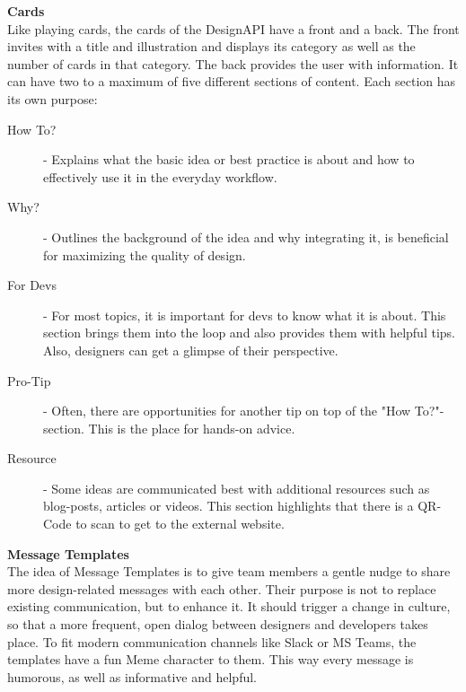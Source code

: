 \textbf{Cards}\\
Like playing cards, the cards of the DesignAPI have a front and a back. The front invites with a
title and illustration and displays its category as well as the number of cards in that category.
The back provides the user with information. It can have two to a maximum of five different sections
of content. Each section has its own purpose:

\begin{description}
    \item[How To?] - Explains what the basic idea or best practice is about and how to
          effectively use it in the everyday workflow.

    \item[Why?] - Outlines the background of the idea and why integrating it, is beneficial for
          maximizing the quality of design.

    \item[For Devs] - For most topics, it is important for devs to know what it is about. This
          section brings them into the loop and also provides them with helpful tips. Also,
          designers can get a glimpse of their perspective.

    \item[Pro-Tip] - Often, there are opportunities for another tip on top of the "How To?"-section.
          This is the place for hands-on advice.

    \item[Resource] - Some ideas are communicated best with additional resources such as blog-posts,
          articles or videos. This section highlights that there is a QR-Code to scan to get to the
          external website.
\end{description}

\textbf{Message Templates}\\
The idea of Message Templates is to give team members a gentle nudge to share more design-related
messages with each other. Their purpose is not to replace existing communication, but to enhance it.
It should trigger a change in culture, so that a more frequent, open dialog between designers and
developers takes place.
To fit modern communication channels like Slack or MS Teams, the templates have a fun Meme character
to them. This way every message is humorous, as well as informative and helpful.

